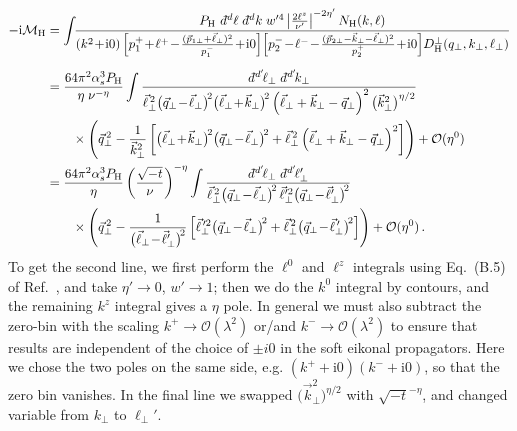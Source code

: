 \documentclass[letterpaper,11pt]{article}
\newcommand{\img}{\mathrm{i}}
\newcommand{\cM}{\mathcal{M}}
\newcommand{\cO}{\mathcal{O}}
\newcommand{\as}{\alpha_s}
\newcommand{\nn}{\nonumber}
\newcommand\prp[1]{\vec #1_\perp}
\newcommand\prpsq[1]{\vec{#1}^{2}_\perp}
\newcommand\prpsqm[2]{\bigl( \prp{#1} \!-\! \prp{#2} \bigr)^{\!2}}
\newcommand\prpsqp[2]{\bigl( \prp{#1} \!+\! \prp{#2} \bigr)^{\!2}}
\newcommand\prnth[1]{\left(#1\right)}
\newcommand{\dbar}{d\hspace*{-0.08em}\bar{}\hspace*{0.1em}}
\begin{document}
\begin{align}\label{eq:Hgraph}
  -\img\cM_{\rm H} &= 
      \int\!\!\frac{P_{\rm H} \ \dbar^d\ell \; \dbar^dk \;  w'^4 \left| \frac{2 \ell^z}{\nu'} \right|^{-2 \eta'} N_\text{H}(k,\ell)}{
      \prnth{k^2 \!+\! \img0}
      \Bigl[p_1^+\!+\!\ell^+ \!-\! 
      \frac{(\vec p_{1\perp}+\vec\ell_\perp)^2}{p_1^-} \!+\! \img0\Bigr]
      \Bigl[p_2^- \!-\! \ell^- \!-\! 
      \frac{(\vec p_{2\perp}-\vec k_\perp -\vec\ell_\perp)^2}{p_2^+} \!+\! \img0\Bigr]
      D_\text{H}^\perp(q_\perp, k_\perp,\ell_\perp)
      }
  \nn \\[.2cm]
  &= \frac{64 \pi^2 \as^3 P_{\rm H}}{\eta \; \nu^{-\eta}} \int\frac{\dbar^{d'}\!\ell_\perp\; \dbar^{d'}\!k_\perp  }{
  \vec\ell_\perp^{\,2} \prpsqm{q}{\ell} \prpsqp{\ell}{k} \left(\prp{\ell} + \prp{k} - \prp{q}  \right)^2 \bigl(\prpsq{k}\bigr)^{\eta/2} 
  } \nn\\ 
  &\qquad \times \left(\vec q_\perp^{\,2} - \frac1{\prpsq{k}} \left[ \prpsqp{\ell}{k} \prpsqm{q}{\ell} + \vec\ell_\perp^{\,2} \left(\prp{\ell} + \prp{k} - \prp{q}  \right)^2 \right] \right) + \mathcal{O}(\eta^0)
  \nn \\
  &= \frac{64 \pi^2 \as^3 P_{\rm H}}{\eta }\left(\frac{\sqrt{-t}}{\nu}\right)^{-\eta} \int\frac{\dbar^{d'}\!\ell_\perp \; \dbar^{d'}\!\ell_\perp'  }{
    \vec\ell_\perp^{\,2} \prpsqm{q}{\ell}\, \vec\ell^{\prime2}_\perp \prpsqm{q}{\ell'}
    } \nn\\ 
    &\qquad \times \left(\vec q_\perp^{\,2} - \frac1{\prpsqm{\ell}{\ell'}} \left[ \vec\ell^{\,\prime2}_\perp \prpsqm{q}{\ell} + \vec\ell_\perp^{\,2} \prpsqm{q}{\ell^{\,\prime}} \right] \right) + \mathcal{O}(\eta^0)
    \,.
  \end{align}
To get the second line, we first perform the $\ell^0$ and $\ell^z$ integrals using Eq.~(B.5) of Ref.~\cite{Rothstein:2016bsq}, and take $\eta' \to 0$, $w' \to 1$;
then we do the $k^0$ integral by contours, and the remaining $k^z$ integral gives a $\eta$ pole.
In general we must also subtract the zero-bin with the scaling $k^+\to\cO(\lambda^2)$ or/and $k^-\to\cO(\lambda^2)$ to ensure that results are independent of the choice of $\pm i0$ in the soft eikonal propagators. Here we chose the two poles on the same side, e.g. $(k^++\img0)(k^-+\img0)$, so that the zero bin vanishes.
In the final line we swapped $\bigl(\vec k_\perp^2\bigr)^{\eta/2}$ with $\sqrt{-t}^{-\eta}$, and changed variable from $k_\perp$ to $\ell_\perp'$.
\end{document}
